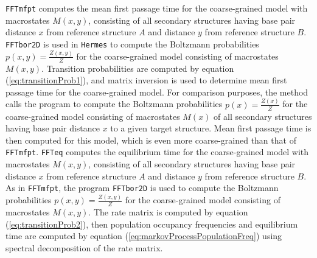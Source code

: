 {\tt FFTmfpt} computes the mean first passage time
for the coarse-grained model with macrostates $M(x,y)$, consisting of
all secondary structures having base pair distance $x$ from reference
structure $A$ and distance $y$ from reference structure $B$.
{\tt FFTbor2D} is used in {\tt Hermes} to compute the Boltzmann probabilities
$p(x,y) = \frac{Z(x,y)}{Z}$ for the coarse-grained model consisting of
macrostates $M(x,y)$. Transition probabilities are computed by
equation (\ref{eq:transitionProb1}), and matrix inversion is used to
determine mean first passage time for the coarse-grained model.
For comparison purposes, the method \fftbor calls the
program \fftbor \cite{Senter.po12} to compute the Boltzmann probabilities
$p(x) = \frac{Z(x)}{Z}$ for the coarse-grained model consisting of
macrostates $M(x)$ of all secondary structures having base pair distance
$x$ to a given target structure. Mean first passage time is then computed
for this model, which is even more coarse-grained than that of {\tt FFTmfpt}.
{\tt FFTeq} computes the equilibrium time
for the coarse-grained model with macrostates $M(x,y)$, consisting of
all secondary structures having base pair distance $x$ from reference
structure $A$ and distance $y$ from reference structure $B$. As in
{\tt FFTmfpt}, the program
{\tt FFTbor2D} is used to compute the Boltzmann probabilities
$p(x,y) = \frac{Z(x,y)}{Z}$ for the coarse-grained model consisting of
macrostates $M(x,y)$. The rate matrix is computed by
equation (\ref{eq:transitionProb2}), then population occupancy
frequencies and equilibrium time
are computed by equation (\ref{eq:markovProcessPopulationFreq})
using spectral decomposition of the rate matrix.


